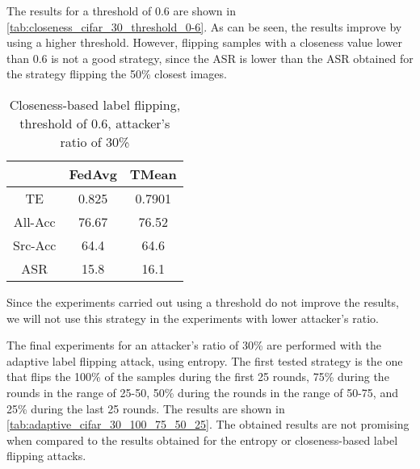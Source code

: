 The results for a threshold of 0.6 are shown in \autoref{tab:closeness_cifar_30_threshold_0-6}. As can be seen, the results improve by using a higher threshold. However, flipping samples with a closeness value lower than 0.6 is not a good strategy, since the ASR is lower than the ASR obtained for the strategy flipping the 50\% closest images.


\begin{table}[h!]
        \centering
        \small
        \begin{adjustbox}{center}
        \begin{tabular}{|c|c|c|}
            \hline
            & FedAvg & TMean \\
            \hline
            TE & 0.825 & 0.7901 \\
            \hline
            All-Acc & 76.67 & 76.52 \\
            \hline
            Src-Acc & 64.4 & 64.6 \\
            \hline
            ASR & 15.8 & 16.1 \\
            \hline
        \end{tabular}
        \end{adjustbox}
        \caption{Closeness-based label flipping, threshold of 0.6, attacker's ratio of 30\%}
        \label{tab:closeness_cifar_30_threshold_0-6}
    \end{table}

Since the experiments carried out using a threshold do not improve the results, we will not use this strategy in the experiments with lower attacker's ratio.

The final experiments for an attacker's ratio of 30\% are performed with the adaptive label flipping attack, using entropy. The first tested strategy is the one that flips the 100\% of the samples during the first 25 rounds, 75\% during the rounds in the range of 25-50, 50\% during the rounds in the range of 50-75, and 25\% during the last 25 rounds. The results are shown in \autoref{tab:adaptive_cifar_30_100_75_50_25}. The obtained results are not promising when compared to the results obtained for the entropy or closeness-based label flipping attacks.

